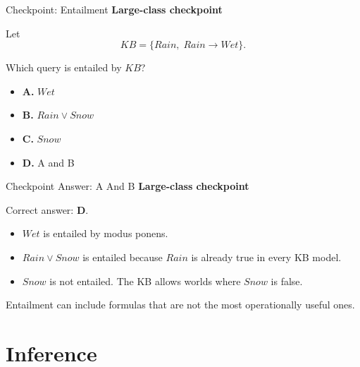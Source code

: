 \documentclass[aspectratio=169,11pt]{beamer}
\newcommand{\activity}{\textbf{\color{unsworange}Large-class checkpoint}}
\newcommand{\choice}[2]{\textbf{#1.} #2}
\begin{document}
\begin{frame}{Checkpoint: Entailment}
  \activity

  \vspace{0.5em}
  Let
  \[
    KB = \{Rain,\; Rain \rightarrow Wet\}.
  \]

  Which query is entailed by $KB$?

  \begin{itemize}
    \item \choice{A}{$Wet$}
    \item \choice{B}{$Rain \lor Snow$}
    \item \choice{C}{$Snow$}
    \item \choice{D}{A and B}
  \end{itemize}
\end{frame}

\begin{frame}{Checkpoint Answer: A And B}
  \activity

  Correct answer: \textbf{D}.

  \begin{itemize}
    \item $Wet$ is entailed by modus ponens.
    \item $Rain \lor Snow$ is entailed because $Rain$ is already true in every KB model.
    \item $Snow$ is not entailed. The KB allows worlds where $Snow$ is false.
  \end{itemize}

  Entailment can include formulas that are not the most operationally useful ones.
\end{frame}

\section{Inference}
\end{document}
